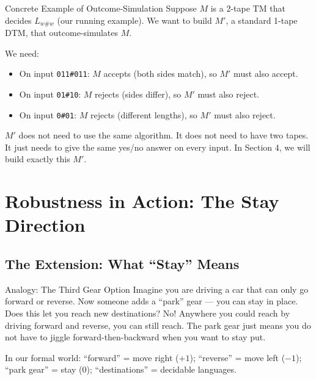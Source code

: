 \documentclass[11pt,a4paper]{article}
\begin{document}
\begin{examplebox}{Concrete Example of Outcome-Simulation}
Suppose $M$ is a 2-tape TM that decides $L_{w\#w}$ (our running example). We want to build $M'$, a standard 1-tape DTM, that outcome-simulates $M$.

We need:
\begin{itemize}[nosep]
\item On input \texttt{011\#011}: $M$ accepts (both sides match), so $M'$ must also accept.
\item On input \texttt{01\#10}: $M$ rejects (sides differ), so $M'$ must also reject.
\item On input \texttt{0\#01}: $M$ rejects (different lengths), so $M'$ must also reject.
\end{itemize}

$M'$ does not need to use the same algorithm. It does not need to have two tapes. It just needs to give the same yes/no answer on every input. In Section 4, we will build exactly this $M'$.
\end{examplebox}

\newpage

\section{Robustness in Action: The Stay Direction}

\subsection{The Extension: What ``Stay'' Means}

\begin{notebox}{Analogy: The Third Gear Option}
Imagine you are driving a car that can only go forward or reverse. Now someone adds a ``park'' gear --- you can stay in place. Does this let you reach new destinations? No! Anywhere you could reach by driving forward and reverse, you can still reach. The park gear just means you do not have to jiggle forward-then-backward when you want to stay put.

In our formal world: ``forward'' = move right ($+1$); ``reverse'' = move left ($-1$); ``park gear'' = stay ($0$); ``destinations'' = decidable languages.
\end{notebox}
\end{document}

